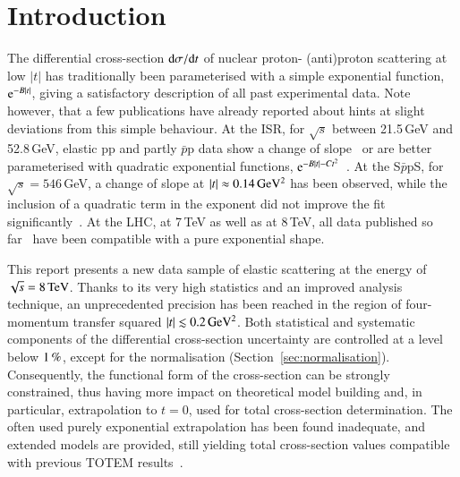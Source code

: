 \section{Introduction}
%
The differential cross-section ${\rm d} \sigma/{\rm d} t$ of nuclear proton-%
(anti)proton 
scattering at low $|t|$ has traditionally been parameterised with a simple 
exponential function, ${\rm e}^{-B |t|}$, giving a satisfactory description of 
all past experimental data.
Note however, that a few publications have already reported about hints at 
slight deviations from this simple behaviour. At the ISR, for $\sqrt{s}$ 
between 21.5\,GeV and 52.8\,GeV, elastic pp and partly $\bar{p}$p data show a 
change of slope~\cite{plb39,plb115} or are better parameterised with quadratic 
exponential functions, ${\rm e}^{-B |t|-C t^2}$~\cite{npb141,npb248}. 
At the S$\bar{p}$pS, for 
$\sqrt{s} = 546\,$GeV, a change of slope at $|t| \approx 0.14\,\rm GeV^{2}$ 
has been observed, while the inclusion of a quadratic term in the exponent did
not improve the fit significantly~\cite{plb147}.
At the LHC, at 7\,TeV as well as at 8\,TeV, all data published so 
far~\cite{epl96,epl101-el,prl111,alfa} have been
compatible with a pure exponential shape.

This report presents a new data sample of elastic scattering at the energy of $\sqrt s = 8\,{\rm TeV}$. Thanks to its very high statistics and an improved analysis technique, an unprecedented precision has been reached in the region of four-momentum transfer squared $|t| \lesssim 0.2\,{\rm GeV^2}$. Both statistical and systematic components of the differential cross-section uncertainty are controlled 
at a level below $1\,{\rm \%}$, except for the normalisation 
(Section~\ref{sec:normalisation}). Consequently, the functional form of the cross-section can be strongly constrained, thus having more impact on theoretical model building and, in particular, extrapolation to $t=0$, used for total cross-section determination. The often used purely exponential extrapolation has been found inadequate, and extended models are provided, still yielding total cross-section values compatible with previous TOTEM results~\cite{prl111}.



